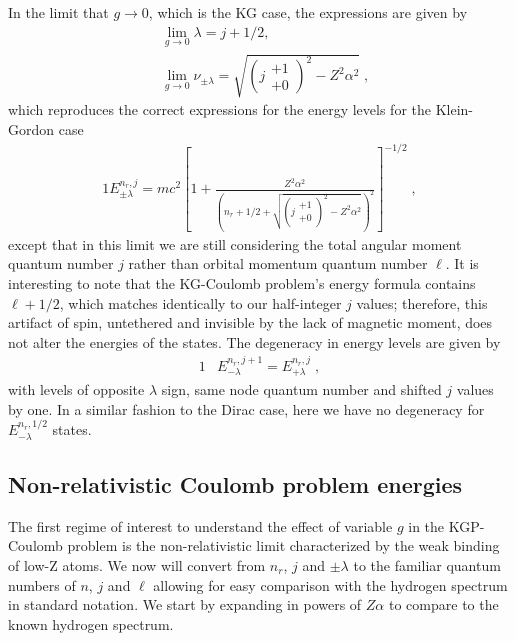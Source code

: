 In the limit that $g\rightarrow 0$, which is the KG case, the expressions are given by
\begin{subequations}
\begin{alignat}{1}
\label{glimit04} &\lim_{g\rightarrow0}\lambda=j+1/2,\\
&\lim_{g\rightarrow0}\nu_{\pm\lambda}=\sqrt{\left(j\begin{smallmatrix} +1 \\ +0 \end{smallmatrix}\right)^{2}-Z^{2}\alpha^{2}}\;,
\end{alignat}
\end{subequations}
which reproduces the correct expressions for the energy levels for the Klein-Gordon case 
\begin{alignat}{1}
\label{glimit05} E_{\pm\lambda}^{n_{r},j}=mc^{2}\left[1+\displaystyle\frac{Z^{2}\alpha^{2}}{\left(n_{r}+1/2+\displaystyle\sqrt{\left(j\begin{smallmatrix} +1 \\ +0 \end{smallmatrix}\right)^{2}-Z^{2}\alpha^{2}}\right)^{2}}\right]^{-1/2}\;,
\end{alignat}
except that in this limit we are still considering the total angular moment quantum number $j$ rather than orbital momentum quantum number $\ell$. It is interesting to note that the KG-Coulomb problem\rq s energy formula contains $\ell+1/2$, which matches identically to our half-integer $j$ values; therefore, this artifact of spin, untethered and invisible by the lack of magnetic moment, does not alter the energies of the states. The degeneracy in energy levels are given by 
\begin{alignat}{1}
\label{glimit06} &E^{n_{r},j+1}_{-\lambda}=E^{n_{r},j}_{+\lambda}\;,\end{alignat}
with levels of opposite $\lambda$ sign, same node quantum number and shifted $j$ values by one. In a similar fashion to the Dirac case, here we have no degeneracy for $E^{n_{r},1/2}_{-\lambda}$ states.

\subsection{Non-relativistic Coulomb problem energies} \label{nonrel}
The first regime of interest to understand the effect of variable $g$ in the KGP-Coulomb problem is the non-relativistic limit characterized by the weak binding of low-Z atoms. We now will convert from $n_{r}$, $j$ and $\pm\lambda$ to the familiar quantum numbers of $n$, $j$ and $\ell$ allowing for easy comparison with the hydrogen spectrum in standard notation. We start by expanding  in powers of $Z\alpha$ to compare to the known hydrogen spectrum. 


